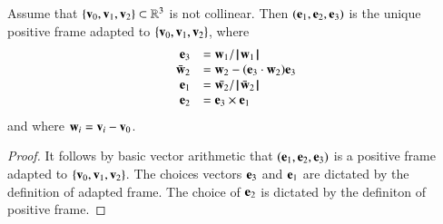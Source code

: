 \begin{lemma}[orthonormalization]
\label{lemma:frame}
  Assume that $\{\v_0,\v_1,\v_2\}\subset\ring{R}^3$ is not collinear.
  Then $(\e_1,\e_2,\e_3)$ is the unique positive frame adapted to
  $\{\v_0,\v_1,\v_2\}$, where
\begin{displaymath}
\begin{array}{rll}
\e_3 &= \w_1/\normo{\w_1}\\
\bar{\w}_2 &= \w_2 - (\e_3\cdot \w_2) \e_3\\
\e_1 &= \bar{\w_2}/\normo{\bar{\w}_2}\\
\e_2 &= \e_3 \times \e_1 \\
\end{array}
\end{displaymath}
and where $\w_i = \v_i - \v_0$.
\end{lemma}

\begin{proof} It follows by basic vector arithmetic that
  $(\e_1,\e_2,\e_3)$ is a positive frame adapted to
  $\{\v_0,\v_1,\v_2\}$.  The choices vectors $\e_3$ and $\e_1$ are
  dictated by the definition of adapted frame.  The choice of $\e_2$
  is dictated by the definiton of positive frame.
\end{proof}

